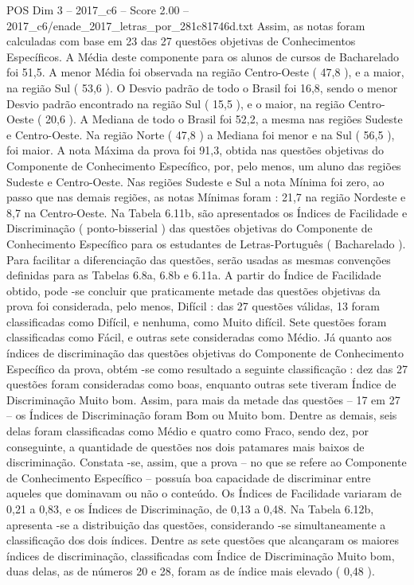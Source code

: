 \begin{textsample}{POS Dim 3 – 2017\_c6 – Score 2.00 – 2017\_c6/enade\_2017\_letras\_por\_281c81746d.txt}
Assim, as notas foram calculadas com base em 23 das 27 questões objetivas de Conhecimentos Específicos.
A Média deste componente para os alunos de cursos de Bacharelado foi 51,5.
A menor Média foi observada na região Centro-Oeste ( 47,8 ), e a maior, na região Sul ( 53,6 ).
O Desvio padrão de todo o Brasil foi 16,8, sendo o menor Desvio padrão encontrado na região Sul ( 15,5 ), e o maior, na região Centro-Oeste ( 20,6 ).
A Mediana de todo o Brasil foi 52,2, a mesma nas regiões Sudeste e Centro-Oeste.
Na região Norte ( 47,8 ) a Mediana foi menor e na Sul ( 56,5 ), foi maior.
A nota Máxima da prova foi 91,3, obtida nas questões objetivas do Componente de Conhecimento Específico, por, pelo menos, um aluno das regiões Sudeste e Centro-Oeste.
Nas regiões Sudeste e Sul a nota Mínima foi zero, ao passo que nas demais regiões, as notas Mínimas foram : 21,7 na região Nordeste e 8,7 na Centro-Oeste.
Na Tabela 6.11b, são apresentados os Índices de Facilidade e Discriminação ( ponto-bisserial ) das questões objetivas do Componente de Conhecimento Específico para os estudantes de Letras-Português ( Bacharelado ).
Para facilitar a diferenciação das questões, serão usadas as mesmas convenções definidas para as Tabelas 6.8a, 6.8b e 6.11a.
A partir do Índice de Facilidade obtido, pode -se concluir que praticamente metade das questões objetivas da prova foi considerada, pelo menos, Difícil : das 27 questões válidas, 13 foram classificadas como Difícil, e nenhuma, como Muito difícil.
Sete questões foram classificadas como Fácil, e outras sete consideradas como Médio.
Já quanto aos índices de discriminação das questões objetivas do Componente de Conhecimento Específico da prova, obtém -se como resultado a seguinte classificação : dez das 27 questões foram consideradas como boas, enquanto outras sete tiveram Índice de Discriminação Muito bom.
Assim, para mais da metade das questões – 17 em 27 – os Índices de Discriminação foram Bom ou Muito bom.
Dentre as demais, seis delas foram classificadas como Médio e quatro como Fraco, sendo dez, por conseguinte, a quantidade de questões nos dois patamares mais baixos de discriminação.
Constata -se, assim, que a prova – no que se refere ao Componente de Conhecimento Específico – possuía boa capacidade de discriminar entre aqueles que dominavam ou não o conteúdo.
Os Índices de Facilidade variaram de 0,21 a 0,83, e os Índices de Discriminação, de 0,13 a 0,48.
Na Tabela 6.12b, apresenta -se a distribuição das questões, considerando -se simultaneamente a classificação dos dois índices.
Dentre as sete questões que alcançaram os maiores índices de discriminação, classificadas com Índice de Discriminação Muito bom, duas delas, as de números 20 e 28, foram as de índice mais elevado ( 0,48 ).

\end{textsample}
